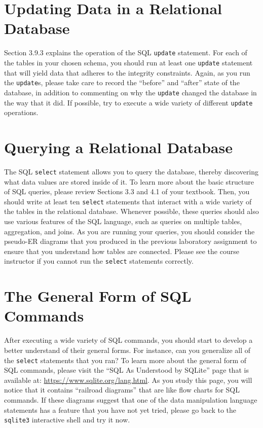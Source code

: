 \vspace*{-.05in}
\section*{Updating Data in a Relational Database}

Section 3.9.3 explains the operation of the SQL {\tt update} statement.  For each of the tables in your chosen schema,
you should run at least one {\tt update} statement that will yield data that adheres to the integrity constraints.
Again, as you run the {\tt update}s, please take care to record the ``before'' and ``after'' state of the database, in
addition to commenting on why the {\tt update} changed the database in the way that it did. If possible, try to execute
a wide variety of different {\tt update} operations.

\vspace*{-.05in}
\section*{Querying a Relational Database}

The SQL {\tt select} statement allows you to query the database, thereby discovering what data values are stored inside
of it. To learn more about the basic structure of SQL queries, please review Sections 3.3 and 4.1 of your textbook.
Then, you should write at least ten {\tt select} statements that interact with a wide variety of the tables in the
relational database.  Whenever possible, these queries should also use various features of the SQL language, such as
queries on multiple tables, aggregation, and joins. As you are running your queries, you should consider the pseudo-ER
diagrams that you produced in the previous laboratory assignment to ensure that you understand how tables are connected.
Please see the course instructor if you cannot run the {\tt select} statements correctly.

\section*{The General Form of SQL Commands}

  After executing a wide variety of SQL commands, you should start to develop a better understand of their general
  forms. For instance, can you generalize all of the {\tt select} statements that you ran? To learn more about the
  general form of SQL commands, please visit the ``SQL As Understood by SQLite'' page that is available at:
  \url{https://www.sqlite.org/lang.html}. As you study this page, you will notice that it contains ``railroad diagrams''
  that are like flow charts for SQL commands. If these diagrams suggest that one of the data manipulation language
  statements has a feature that you have not yet tried, please go back to the {\tt sqlite3} interactive shell and try it
  now.

